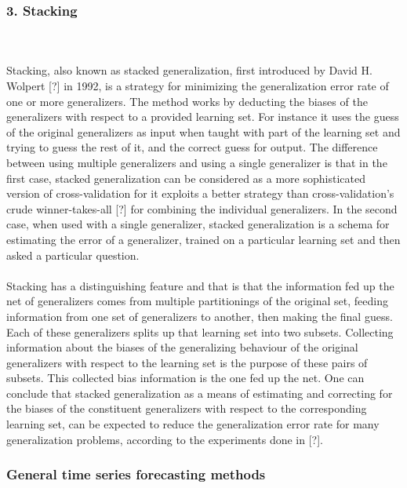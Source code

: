 \documentclass[runningheads,a4paper]{llncs}[2015/06/24]
\begin{document}
\subsubsection{3. Stacking}
\hspace{1cm}\\\\ Stacking, also known as stacked generalization, first introduced by David H. Wolpert [?] in 1992, is a strategy for minimizing the generalization error rate of one or more generalizers. The method works by deducting the biases of the generalizers with respect to a provided learning set. For instance it uses the guess of the original generalizers as input when taught with part of the learning set and trying to guess the rest of it, and the correct guess for output. The difference between using multiple generalizers and using a single generalizer is that in the first case, stacked generalization can be considered as a more sophisticated version of cross-validation for it exploits a better strategy than cross-validation's crude winner-takes-all [?] for combining the individual generalizers. In the second case, when used with a single generalizer, stacked generalization is a schema for estimating the error of a generalizer, trained on a particular learning set and then asked a particular question. \\\\Stacking has a distinguishing feature and that is that the information fed up the net of generalizers comes from multiple partitionings of the original set, feeding information from one set of generalizers to another, then making the final guess. Each of these generalizers splits up that learning set into two subsets. Collecting information about the biases of the generalizing behaviour of the original generalizers with respect to the learning set is the purpose of these pairs of subsets. This collected bias information is the one fed up the net. One can conclude that stacked generalization as a means of estimating and correcting for the biases of the constituent generalizers with respect to the corresponding learning set, can be expected to reduce the generalization error rate for many generalization problems, according to the experiments done in [?].
		 
		\subsubsection{General time series forecasting methods}
\end{document}
